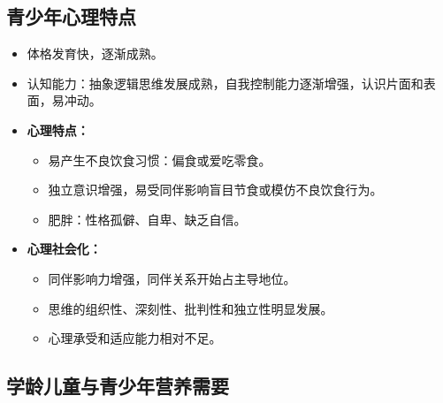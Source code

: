 \subsection{青少年心理特点}

\begin{defbox}
\begin{itemize}[leftmargin=*]
    \item 体格发育快，逐渐成熟。
    \item 认知能力：抽象逻辑思维发展成熟，自我控制能力逐渐增强，认识片面和表面，易冲动。

    \item \textbf{心理特点：}
    \begin{itemize}
        \item 易产生不良饮食习惯：偏食或爱吃零食。
        \item 独立意识增强，易受同伴影响盲目节食或模仿不良饮食行为。
        \item 肥胖：性格孤僻、自卑、缺乏自信。
    \end{itemize}

    \item \textbf{心理社会化：}
    \begin{itemize}
        \item 同伴影响力增强，同伴关系开始占主导地位。
        \item 思维的组织性、深刻性、批判性和独立性明显发展。
        \item 心理承受和适应能力相对不足。
    \end{itemize}
\end{itemize}
\end{defbox}

\subsection{学龄儿童与青少年营养需要}

